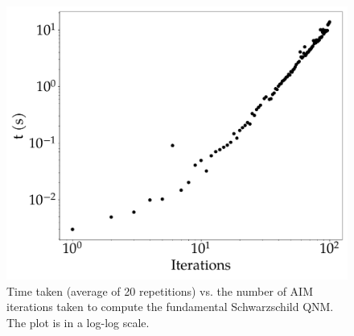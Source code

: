 \begin{figure}[!ht]
  \centering
  \includegraphics[width=\linewidth]{img/aim_qnm/perf.pdf}
  \caption{Time taken (average of 20 repetitions) vs. the number of \ac{AIM} iterations taken to compute the fundamental Schwarzschild \ac{QNM}. The plot is in a log-log scale.}
  \label{fig:package_perf}
\end{figure}